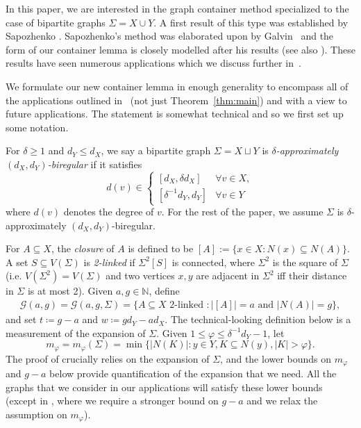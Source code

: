 \documentclass[a4paper]{amsart}
\theoremstyle{definition}
\newcommand{\cG}{\mathcal{G} }
\newcommand{\gd}[0]{\delta }
\newcommand{\sub}[0]{\subseteq}
\newcommand{\0}[0]{\emptyset}
\begin{document}
In this paper, we are interested in the graph container method specialized to the case of bipartite graphs $\Sigma=X \cup 
 Y$. A first result of this type was established by Sapozhenko \cite{sapocontainer}. Sapozhenko's method was elaborated upon by Galvin~\cite{Galvin_independent} and the form of our container lemma is closely modelled after his results (see also \cite{galvin_threshold, galvin2006slow}).  These results have seen numerous applications which we discuss further in~.

We formulate our new container lemma in enough generality to encompass all of the applications outlined in~ (not just Theorem~\ref{thm:main}) and with a view to future applications. The statement is somewhat technical and so we first set up some notation.

For $\delta\geq 1$ and $d_Y \le d_X$, we say a bipartite graph $\Sigma=X \sqcup Y$ is \emph{$\delta$-approximately $(d_X, d_Y)$-biregular} if it satisfies 
\[d(v) \in \begin{cases}
    [d_X, \delta d_X] &\forall v\in X, \\
    [\delta^{-1}d_Y, d_Y]  & \forall v\in Y
    \end{cases}\]
where $d(v)$ denotes the degree of $v$.
For the rest of the paper, we assume $\Sigma$ is $\gd$-approximately $(d_X, d_Y)$-biregular. 

For $A \sub X$, the \textit{closure} of $A$ is defined to be  $[A]:=\{x \in X: N(x) \sub N(A)\}.$ A set $S \sub V(\Sigma)$ is \textit{2-linked} if $\Sigma^2[S]$ is connected, where $\Sigma^2$ is the square of $\Sigma$ (i.e. $V(\Sigma^2)=V(\Sigma)$ and two vertices $x,y$ are adjacent in $\Sigma^2$ iff their distance in $\Sigma$ is at most 2). Given $a, g\in\mathbb{N}$, define
\begin{align}\label{eq:GagDef}
\cG(a,g)=\cG(a,g,\Sigma)=\{A \subseteq X \text{ 2-linked }: |[A]|=a \text{ and } |N(A)|=g\},
\end{align}
and set $t\coloneqq g-a$ and $w\coloneqq gd_Y-ad_X$.
The technical-looking definition below is a measurement of the expansion of $\Sigma$.  Given $1\leq \varphi \leq \delta^{-1}d_Y-1$, let
\[m_\varphi=m_\varphi(\Sigma)=\min\{|N(K)|: y \in Y, K \sub N(y), |K| >\varphi\}.\]
The proof of  crucially relies on the expansion of $\Sigma$, and the lower bounds on $m_\varphi$ and $g-a$ below provide quantification of the expansion that we need. All the graphs that we consider in our applications will satisfy these lower bounds (except in , where we require a stronger bound on $g-a$ and we relax the assumption on $m_{\varphi}$).
\end{document}
